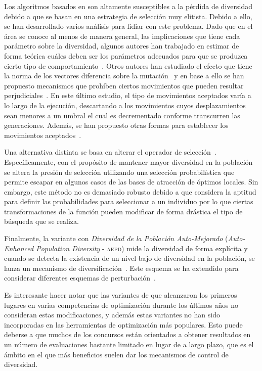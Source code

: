 Los algoritmos basados en \DE{} son altamente susceptibles a la pérdida de diversidad debido a que se basan en una estrategia de selección muy elitista.
%
Debido a ello, se han desarrollado varios análisis para lidiar con este problema.
%
Dado que en el área se conoce al menos de manera general, las implicaciones que tiene cada parámetro sobre la diversidad, algunos autores han trabajado
en estimar de forma teórica cuáles deben ser los parámetros adecuados para que se produzca cierto tipo de comportamiento~\cite{zaharie2003control}.
%
Otros autores han estudiado el efecto que tiene la norma de los vectores diferencia sobre la mutación~\cite{montgomery2009differential} y en base
a ello se han propuesto mecanismos que prohíben ciertos movimientos que pueden resultar perjudiciales~\cite{montgomery2012simple}.
%
En este último estudio, el tipo de movimientos aceptados varía a lo largo de la ejecución, descartando a los movimientos cuyos desplazamientos sean menores
a un umbral el cual es decrementado conforme transcurren las generaciones.
%
Además, se han propuesto otras formas para establecer los movimientos aceptados~\cite{bolufe2013differential}.

Una alternativa distinta se basa en alterar el operador de selección~\cite{sa2008exploration}.
%
Específicamente, con el propósito de mantener mayor diversidad en la población se altera la presión de selección utilizando una selección probabilística que
permite escapar en algunos casos de las bases de atracción de óptimos locales.
%
Sin embargo, este método no es demasiado robusto debido a que considera la aptitud para definir las probabilidades para seleccionar a un individuo por lo que ciertas 
transformaciones de la función pueden modificar de forma drástica el tipo de búsqueda que se realiza.

Finalmente, la variante \DE{} con \textit{Diversidad de la Población Auto-Mejorado} (\textit{Auto-Enhanced Population Diversity} - \textsc{aepd}) 
mide la diversidad de forma explícita y cuando se detecta la existencia de un nivel bajo de diversidad en la población, se 
lanza un mecanismo de diversificación~\cite{yang2015differential}.
%
Este esquema se ha extendido para considerar diferentes esquemas de perturbación~\cite{zhao2016differential}.

Es interesante hacer notar que las variantes de \DE{} que alcanzaron los primeros lugares en varias competencias de optimización durante los últimos años
no consideran estas modificaciones, y además estas variantes no han sido incorporadas en las herramientas de optimización más populares.
%
Esto puede deberse a que muchos de los concursos están orientados a obtener resultados en un número de evaluaciones bastante limitado en lugar de a largo plazo,
que es el ámbito en el que más beneficios suelen dar los mecanismos de control de diversidad.


